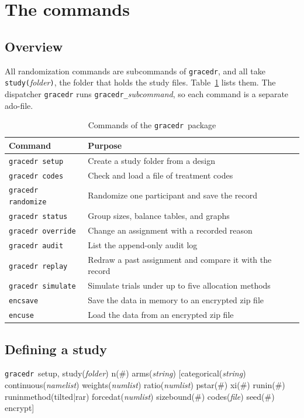 \documentclass[bib]{statapress}
\newcommand{\gracedr}{\texttt{gracedr}}
\begin{document}
\section{The commands}
\label{sec:commands}

\subsection{Overview}

All randomization commands are subcommands of \gracedr, and all take
\texttt{study(}\emph{folder}\texttt{)}, the folder that holds the study files.
Table~\ref{tab:commands} lists them. The dispatcher \texttt{gracedr} runs
\texttt{gracedr\_}\emph{subcommand}, so each command is a separate ado-file.

\begin{table}[htbp]
\centering
\caption{Commands of the \gracedr\ package}
\label{tab:commands}
\begin{tabular}{ll}
\hline
Command & Purpose \\
\hline
\texttt{gracedr setup} & Create a study folder from a design \\
\texttt{gracedr codes} & Check and load a file of treatment codes \\
\texttt{gracedr randomize} & Randomize one participant and save the record \\
\texttt{gracedr status} & Group sizes, balance tables, and graphs \\
\texttt{gracedr override} & Change an assignment with a recorded reason \\
\texttt{gracedr audit} & List the append-only audit log \\
\texttt{gracedr replay} & Redraw a past assignment and compare it with the
record \\
\texttt{gracedr simulate} & Simulate trials under up to five allocation
methods \\
\texttt{encsave} & Save the data in memory to an encrypted zip file \\
\texttt{encuse} & Load the data from an encrypted zip file \\
\hline
\end{tabular}
\end{table}

\subsection{Defining a study}

\begin{stlog}
\gracedr\ setup, study(\emph{folder}) n(\#) arms(\emph{string})
    [categorical(\emph{string}) continuous(\emph{namelist}) weights(\emph{numlist})
    ratio(\emph{numlist}) pstar(\#) xi(\#) runin(\#) runinmethod(tilted|rar)
    forcedat(\emph{numlist}) sizebound(\#) codes(\emph{file}) seed(\#) encrypt]
\end{stlog}
\end{document}
